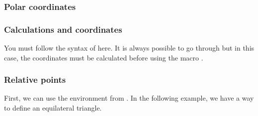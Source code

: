 \subsubsection{Polar coordinates }

\begin{tkzexample}[latex=7cm,small]
\end{tkzexample}

\subsubsection{Calculations and coordinates}
You must follow the syntax of  here. It is always possible to go through  but in this case, the coordinates must be calculated before using the macro .

\begin{tkzexample}[latex=6cm,small]
\end{tkzexample}


\subsubsection{Relative points}
First, we can use the  environment from \TIKZ.
In the following example, we have a way to define an equilateral triangle.

\begin{tkzexample}[latex=7cm,small]
\end{tkzexample}

